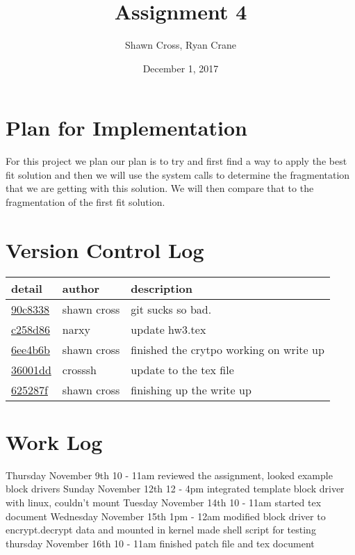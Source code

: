 \documentclass[letterpaper,10pt,titlepage]{article}
\begin{document}
\title{Assignment 4}
\date{December 1, 2017}
\author{Shawn Cross, Ryan Crane}
\maketitle

\section{Plan for Implementation}

For this project we plan our plan is to try and first find a way to apply the 
best fit solution and then we will use the system calls to determine the 
fragmentation that we are getting with this solution. We will then compare 
that to the fragmentation of the first fit solution. 

\section{Version Control Log}
\begin{tabular}{l l l}\textbf{detail} & \textbf{author} & \textbf{description}\\\hline
\href{https://github.com/crosssh/cs444/commit/90c833816bad716ceedd20fe1b47ce2d5822b3e0}{90c8338} & shawn cross & git sucks so bad.\\\hline
\href{https://github.com/crosssh/cs444/commit/c258d8693943c8d485286b946f36b00db533652c}{c258d86} & narxy & update hw3.tex\\\hline
\href{https://github.com/crosssh/cs444/commit/6ee4b6b1f3698e604beb00abe07b3988e9ab4f29}{6ee4b6b} & shawn cross & finished the crytpo working on write up\\\hline
\href{https://github.com/crosssh/cs444/commit/36001ddeb5eecb218672829156a124c4a0971a8e}{36001dd} & crosssh & update to the tex file\\\hline
\href{https://github.com/crosssh/cs444/commit/625287fc9915eb508139598719b3c66a33ecc80e}{625287f} & shawn cross & finishing up the write up\\\hline\end{tabular}

\section{Work Log}
Thursday November 9th 10 - 11am 
reviewed the assignment, looked example block drivers
Sunday November 12th 12 - 4pm
integrated template block driver with linux, couldn't mount
Tuesday November 14th 10 - 11am
started tex document
Wednesday November 15th 1pm - 12am
modified block driver to encrypt.decrypt data and mounted in kernel
made shell script for testing
thursday November 16th 10 - 11am
finished patch file and tex document
\end{document}
